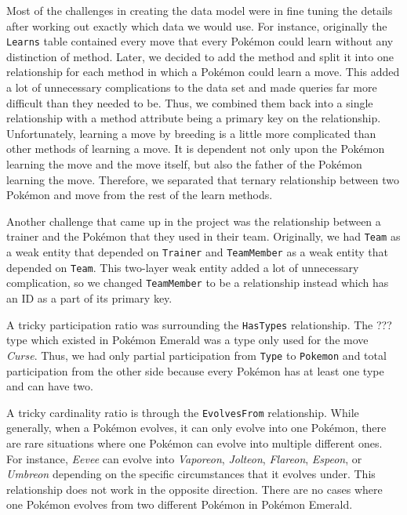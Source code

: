 \documentclass{article}
\begin{document}
Most of the challenges in creating the data model were in fine tuning the details after working
out exactly which data we would use. For instance, originally the \verb+Learns+ table contained
every move that every Pok\'emon could learn without any distinction of method. Later, we decided
to add the method and split it into one relationship for each method in which a Pok\'emon could
learn a move. This added a lot of unnecessary complications to the data set and made queries
far more difficult than they needed to be. Thus, we combined them back into a single relationship 
with a method attribute being a primary key on the relationship. Unfortunately, learning a move by
breeding is a little more complicated than other methods of learning a move. It is dependent not
only upon the Pok\'emon learning the move and the move itself, but also the father of the 
Pok\'emon learning the move. Therefore, we separated that ternary relationship between two
Pok\'emon and move from the rest of the learn methods.

Another challenge that came up in the project was the relationship between a trainer and the 
Pok\'emon that they used in their team. Originally, we had \verb+Team+ as a weak entity that 
depended on \verb+Trainer+ and \verb+TeamMember+ as a weak entity that depended on \verb+Team+.
This two-layer weak entity added a lot of unnecessary complication, so we changed 
\verb+TeamMember+ to be a relationship instead which has an ID as a part of its primary key.

A tricky participation ratio was surrounding the \verb+HasTypes+ relationship. The ??? type
which existed in Pok\'emon Emerald was a type only used for the move \emph{Curse}.
Thus, we had only partial participation from \verb+Type+ to \verb+Pokemon+ and total participation
from the other side because every Pok\'emon has at least one type and can have two.

A tricky cardinality ratio is through the \verb+EvolvesFrom+ relationship. While generally, when
a Pok\'emon evolves, it can only evolve into one Pok\'emon, there are rare situations where
one Pok\'emon can evolve into multiple different ones. For instance, \emph{Eevee} can evolve into 
\emph{Vaporeon}, \emph{Jolteon}, \emph{Flareon}, \emph{Espeon}, or \emph{Umbreon} depending on the
specific circumstances that it evolves under. This relationship does not work in the opposite 
direction. There are no cases where one Pok\'emon evolves from two different Pok\'emon in 
Pok\'emon Emerald.
\end{document}
